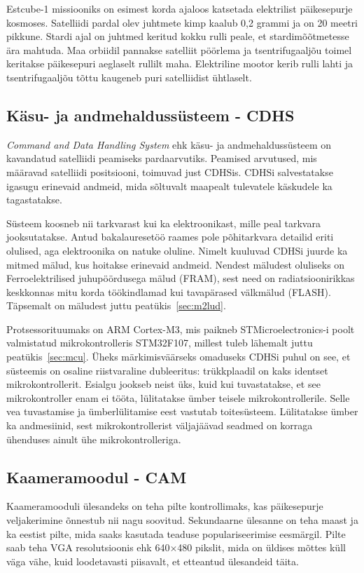 \documentclass[12pt,a4paper]{article}
\begin{document}
Estcube-1 missiooniks on esimest korda ajaloos katsetada elektrilist
päikesepurje kosmoses. Satelliidi pardal olev juhtmete kimp kaalub 0,2 grammi ja
on 20 meetri pikkune. Stardi ajal on juhtmed keritud kokku rulli peale, et
stardimõõtmetesse ära mahtuda. Maa orbiidil pannakse satelliit pöörlema ja
tsentrifugaaljõu toimel keritakse päikesepuri aeglaselt rullilt maha.
Elektriline mootor kerib rulli lahti ja tsentrifugaaljõu tõttu kaugeneb puri
satelliidist ühtlaselt.
\subsection{Käsu- ja andmehaldussüsteem - CDHS}
\textit{Command and Data Handling System} ehk käsu- ja andmehaldussüsteem on
kavandatud satelliidi peamiseks pardaarvutiks. Peamised arvutused, mis määravad
satelliidi positsiooni, toimuvad just CDHSis. CDHSi salvestatakse igasugu
erinevaid andmeid, mida sõltuvalt maapealt tulevatele käskudele ka tagastatakse.

Süsteem koosneb nii tarkvarast kui ka elektroonikast, mille peal tarkvara
jooksutatakse. Antud bakalauresetöö raames pole põhitarkvara detailid eriti
olulised, aga elektroonika on natuke oluline. Nimelt kuuluvad CDHSi juurde ka
mitmed mälud, kus hoitakse erinevaid andmeid. Nendest mäludest oluliseks on
Ferroelektrilised juhupöördusega mälud (FRAM), sest need on radiatsioonirikkas
keskkonnas mitu korda töökindlamad kui tavapärased välkmälud (FLASH). Täpsemalt
on mäludest juttu peatükis~\ref{sec:m2lud}.

Protsessorituumaks on ARM Cortex-M3, mis paikneb STMicroelectronics-i poolt
valmistatud mikrokontrolleris STM32F107, millest tuleb lähemalt juttu
peatükis~\ref{sec:mcu}. Üheks märkimisväärseks omaduseks CDHSi puhul on see, et
süsteemis on osaline riistvaraline dubleeritus: trükkplaadil on kaks identset
mikrokontrollerit. Esialgu jookseb neist üks, kuid kui tuvastatakse, et see
mikrokontroller enam ei tööta, lülitatakse ümber teisele mikrokontrollerile.
Selle vea tuvastamise ja ümberlülitamise eest vastutab toitesüsteem. Lülitatakse
ümber ka andmesiinid, sest mikrokontrollerist väljajäävad seadmed on korraga
ühenduses ainult ühe mikrokontrolleriga.

\subsection{Kaameramoodul - CAM}
Kaameramooduli ülesandeks on teha pilte kontrollimaks, kas päikesepurje
veljakerimine õnnestub nii nagu soovitud. Sekundaarne ülesanne on teha maast ja
ka eestist pilte, mida saaks kasutada teaduse populariseerimise eesmärgil.
Pilte saab teha VGA resolutsioonis ehk 640\(\times\)480 pikslit, mida on üldises
mõttes küll väga vähe, kuid loodetavasti piisavalt, et etteantud ülesandeid
täita.
\end{document}

